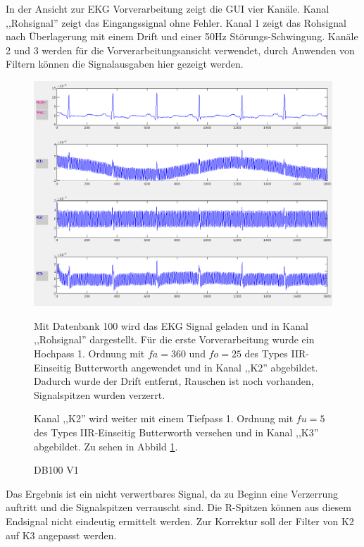\documentclass[a4paper,12pt,titlepage]{scrartcl}
\begin{document}
In der Ansicht zur EKG Vorverarbeitung zeigt die GUI vier Kanäle. Kanal ,,Rohsignal'' zeigt das Eingangssignal ohne Fehler. Kanal 1 zeigt das Rohsignal nach Überlagerung mit einem Drift und einer 50Hz Störungs-Schwingung. Kanäle 2 und 3 werden für die Vorverarbeitungsansicht verwendet, durch Anwenden von Filtern können die Signalausgaben hier gezeigt werden.

\begin{figure}[ht]
    \begin{minipage}[t]{0.5\linewidth}
        \centering
        \includegraphics[width=0.9\linewidth, valign=t]{Assets/LaborBMT-15-20-37.png}
        \caption{DB100 V1}
        \label{db100v1}
    \end{minipage}%
    \begin{minipage}[t]{0.5\linewidth}
        Mit Datenbank 100 wird das EKG Signal geladen und in Kanal ,,Rohsignal'' dargestellt. Für die erste Vorverarbeitung wurde ein Hochpass 1. Ordnung mit $fa=360$ und $fo=25$ des Types IIR-Einseitig Butterworth angewendet und in Kanal ,,K2'' abgebildet. Dadurch wurde der Drift entfernt, Rauschen ist noch vorhanden, Signalspitzen wurden verzerrt.

        Kanal ,,K2'' wird weiter mit einem Tiefpass 1. Ordnung mit $fu=5$ des Types IIR-Einseitig Butterworth versehen und in Kanal ,,K3'' abgebildet.
        Zu sehen in Abbild \ref{db100v1}.
    \end{minipage}
\end{figure}
Das Ergebnis ist ein nicht verwertbares Signal, da zu Beginn eine Verzerrung auftritt und die Signalspitzen verrauscht sind. Die R-Spitzen können aus diesem Endsignal nicht eindeutig ermittelt werden. Zur Korrektur soll der Filter von K2 auf K3 angepasst werden.
\end{document}
